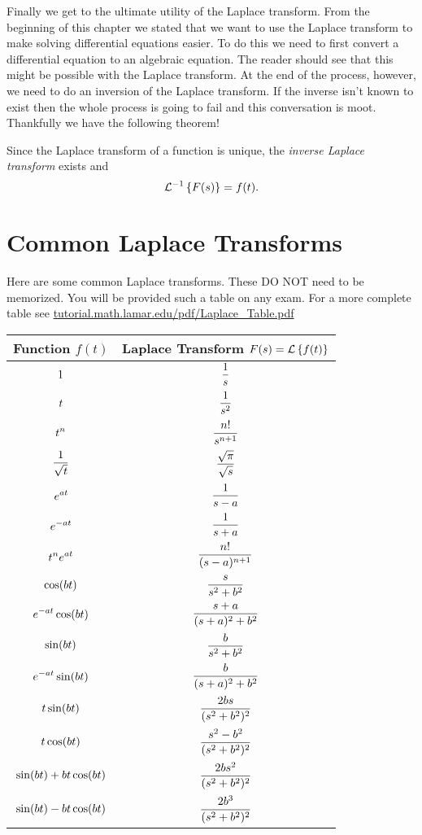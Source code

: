 Finally we get to the ultimate utility of the Laplace transform.  From the beginning of
this chapter we stated that we want to use the Laplace transform to make solving
differential equations easier.  To do this we need to first convert a differential
equation to an algebraic equation.  The reader should see that this might be possible with
the Laplace transform.  At the end of the process, however, we need to do an inversion of
the Laplace transform.  If the inverse isn't known to exist then the whole process is
going to fail and this conversation is moot.  Thankfully we have the following theorem!
\begin{thm}
    Since the Laplace transform of a function is unique, the {\it inverse Laplace
    transform} exists and
    \[ \mathcal{L}^{-1}\left\{ F(s) \right\} = f(t). \]
\end{thm}


\newpage\section{Common Laplace Transforms}
Here are some common Laplace transforms.  These DO NOT need to be memorized.  You will be
provided such a table on any exam.  For a more complete table see
\href{http://tutorial.math.lamar.edu/pdf/Laplace_Table.pdf}{tutorial.math.lamar.edu/pdf/Laplace\_Table.pdf}
\begin{center}
    \setlength\extrarowheight{10pt}
    \begin{tabular}{|c|c|}
        \hline
        Function $f(t)$ & Laplace Transform $F(s) = \mathcal{L}\left\{ f(t) \right\}$ \\ \hline \hline
        $\displaystyle 1$ & $\displaystyle \frac{1}{s}$ \\\hline
        $\displaystyle t$ & $\displaystyle \frac{1}{s^2}$ \\\hline
        $\displaystyle t^n$ & $\displaystyle \frac{n!}{s^{n+1}}$ \\\hline
        $\displaystyle \frac{1}{\sqrt{t}}$ & $\displaystyle \frac{\sqrt{\pi}}{\sqrt{s}}$ \\\hline
        $\displaystyle e^{at}$ & $\displaystyle \frac{1}{s-a}$ \\\hline
        $\displaystyle e^{-at}$ & $\displaystyle \frac{1}{s+a}$ \\\hline
        $\displaystyle t^n e^{at}$ & $\displaystyle \frac{n!}{(s-a)^{n+1}}$ \\\hline
        $\displaystyle \cos(bt)$ & $\displaystyle \frac{s}{s^2 + b^2}$ \\\hline
        $\displaystyle e^{-at}\cos(bt)$ & $\displaystyle \frac{s+a}{(s+a)^2+b^2}$ \\\hline
        $\displaystyle \sin(bt)$ & $\displaystyle \frac{b}{s^2+b^2}$ \\\hline
        $\displaystyle e^{-at}\sin(bt)$ & $\displaystyle \frac{b}{(s+a)^2+b^2}$ \\\hline
        $\displaystyle t \sin(bt)$ & $\displaystyle \frac{2bs}{(s^2+b^2)^2}$ \\\hline
        $\displaystyle t \cos(bt)$ & $\displaystyle \frac{s^2-b^2}{(s^2+b^2)^2}$ \\\hline
        $\displaystyle \sin(bt) + bt \cos(bt)$ & $\displaystyle \frac{2bs^2}{(s^2+b^2)^2}$ \\\hline
        $\displaystyle \sin(bt) - bt \cos(bt)$ & $\displaystyle \frac{2b^3}{(s^2+b^2)^2}$ \\\hline
    \end{tabular}
\end{center}


